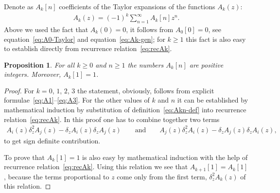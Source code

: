 \documentclass[pdftex]{sigma}
\numberwithin{equation}{section}
\newtheorem{Proposition}[Theorem]{Proposition}
 { \theoremstyle{definition}
\newtheorem{Remark}[Theorem]{Remark} }
\begin{document}
Denote as $A_k[n]$ coefficients of the Taylor expansions of the functions $A_k(z)$:
\begin{gather}\label{eq:Akn-def}
A_k(z)=(-1)^k\sum\limits_{n=1}^{\infty} A_k[n]z^n.
\end{gather}
Above we used the fact that $A_k(0)=0$, it follows from $A_0[0]=0$, see equation~\eqref{eq:A0-Taylor} and
equation~\eqref{eq:Ak-gen}; for $k\geq1$ this fact is also easy to establish directly from recurrence relation~\eqref{eq:recAk}.
\begin{Proposition}\label{prop:Akn-positive}
For all $k\geq0$ and $n\geq1$ the numbers $A_k[n]$ are positive integers. Moreover, $A_k[1]=1$.
\end{Proposition}
\begin{proof}
For $k=0$, $1$, $2$, $3$ the statement, obviously, follows from explicit formulae~\eqref{eq:A1}--\eqref{eq:A3}.
For the other values of $k$ and $n$ it can be established by mathematical induction by substitution of definition~\eqref{eq:Akn-def}
into recurrence relation~\eqref{eq:recAk}. In this proof one has to combine together two terms
\begin{gather*}
A_i(z)\delta^2_zA_j(z)-\delta_zA_i(z)\delta_zA_j(z)\qquad
\mathrm{and}\qquad
A_j(z)\delta^2_zA_i(z)-\delta_zA_j(z)\delta_zA_i(z),
\end{gather*}
to get sign definite contribution.

To prove that $A_k[1]=1$ is also easy by mathematical induction with the help of recurrence relation~\eqref{eq:recAk}.
Using this relation we see that $A_{k+1}[1]=A_k[1]$, because the terms proportional to $z$ come only from the first term,
$\delta^2_zA_k(z)$ of this relation.
\end{proof}
\end{document}
